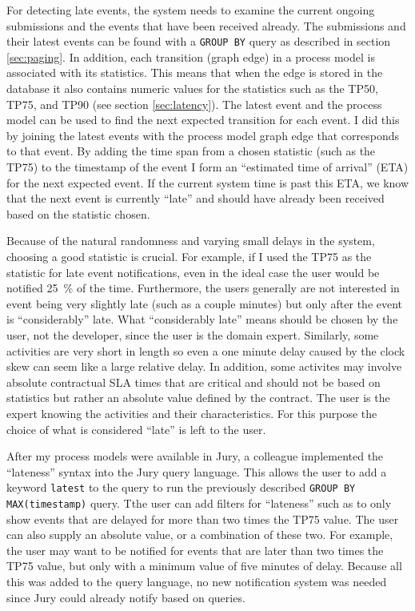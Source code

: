 For detecting late events, the system needs to examine the current ongoing submissions and the events that have been received already.
The submissions and their latest events can be found with a \texttt{GROUP BY} query as described in section \ref{sec:paging}.
In addition, each transition (graph edge) in a process model is associated with its statistics. 
This means that when the edge is stored in the database it also contains numeric values for the statistics such as the TP50, TP75, and TP90 (see section \ref{sec:latency}).
The latest event and the process model can be used to find the next expected transition for each event.
I did this by joining the latest events with the process model graph edge that corresponds to that event.
By adding the time span from a chosen statistic (such as the TP75) to the timestamp of the event I form an ``estimated time of arrival'' (ETA) for the next expected event.
If the current system time is past this ETA, we know that the next event is currently ``late'' and should have already been received based on the statistic chosen.

Because of the natural randomness and varying small delays in the system, choosing a good statistic is crucial. 
For example, if I used the TP75 as the statistic for late event notifications, even in the ideal case the user would be notified 25~\% of the time.
Furthermore, the users generally are not interested in event being very slightly late (such as a couple minutes) but only after the event is ``considerably'' late.
What ``considerably late'' means should be chosen by the user, not the developer, since the user is the domain expert.
Similarly, some activities are very short in length so even a one minute delay caused by the clock skew can seem like a large relative delay.
In addition, some activites may involve absolute contractual SLA times that are critical and should not be based on statistics but rather an absolute value defined by the contract.
The user is the expert knowing the activities and their characteristics.
For this purpose the choice of what is considered ``late'' is left to the user.

After my process models were available in Jury, a colleague implemented the ``lateness'' syntax into the Jury query language. 
This allows the user to add a keyword \texttt{latest} to the query to run the previously described \texttt{GROUP BY MAX(timestamp)} query.
Tthe user can add filters for ``lateness'' such as to only show events that are delayed for more than two times the TP75 value.
The user can also supply an absolute value, or a combination of these two.
For example, the user may want to be notified for events that are later than two times the TP75 value, but only with a minimum value of five minutes of delay.
Because all this was added to the query language, no new notification system was needed since Jury could already notify based on queries.

